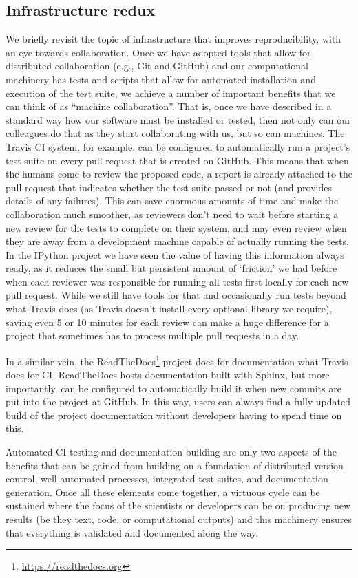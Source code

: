 \documentclass[ChapterTOCs,krantz2]{krantz} %
\begin{document}
\subsection{Infrastructure redux}

We briefly revisit the topic of infrastructure that improves reproducibility,
with an eye towards collaboration.  Once we have adopted tools that allow for
distributed collaboration (e.g., Git and GitHub) and our computational
machinery has tests and scripts that allow for automated installation and
execution of the test suite, we achieve a number of important benefits that we
can think of as ``machine collaboration''.  That is, once we have described in
a standard way how our software must be installed or tested, then not only can
our colleagues do that as they start collaborating with us, but so can
machines.  The Travis CI system, for example, can be configured to
automatically run a project's test suite on every pull request that is created
on GitHub.  This means that when the humans come to review the proposed code,
a report is already attached to the pull request that indicates whether the
test suite passed or not (and provides details of any failures).  This can
save enormous amounts of time and make the collaboration much smoother, as
reviewers don't need to wait before starting a new review for the tests to
complete on their system, and may even review when they are away from a
development machine capable of actually running the tests.  In the IPython
project we have seen the value of having this information always ready, as it
reduces the small but persistent amount of `friction' we had before when each
reviewer was responsible for running all tests first locally for each new pull
request.  While we still have tools for that and occasionally run tests beyond
what Travis does (as Travis doesn't install every optional library we
require), saving even 5 or 10 minutes for each review can make a huge
difference for a project that sometimes has to process multiple pull requests
in a day.

In a similar vein, the ReadTheDocs\footnote{\url{https://readthedocs.org}}
project does for documentation what Travis does for CI.  ReadTheDocs hosts
documentation built with Sphinx, but more importantly, can be configured to
automatically build it when new commits are put into the project at GitHub.  In
this way, users can always find a fully updated build of the project
documentation without developers having to spend time on this.

Automated CI testing and documentation building are only two aspects of the
benefits that can be gained from building on a foundation of distributed
version control, well automated processes, integrated test suites, and
documentation generation.  Once all these elements come together, a virtuous
cycle can be sustained where the focus of the scientists or developers can be
on producing new results (be they text, code, or computational outputs) and this
machinery ensures that everything is validated and documented along the way.
\end{document}
